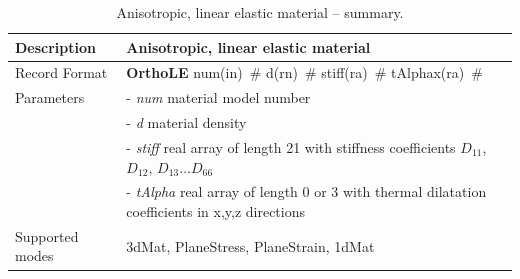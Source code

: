 \documentclass[a4paper]{article}
\newcommand{\descitem}[1]{{\noindent \bf #1}}
\newcommand{\elemparam}[2]{{{#1\tiny (#2)}~\#}}
\newcommand{\param}[1]{{\it #1}}
\newenvironment{mmt}{\begin{tabular}{|l|p{9cm}|}}{\end{tabular}\\}
\newenvironment{mmt}{\begin{tabular}{|l|l|}}{\end{tabular}\\}
\begin{document}
\begin{table}[!htb]
\begin{mmt}
\hline
Description & Anisotropic, linear elastic material\\
\hline
Record Format & \descitem{OrthoLE} \elemparam{num}{in}
\elemparam{d}{rn} \elemparam{stiff}{ra} \elemparam{tAlphax}{ra} \\
Parameters &- \param{num} material model number\\
&- \param{d} material density\\
&- \param{stiff} real array of length 21 with stiffness coefficients $D_{11}$, $D_{12}$, $D_{13}\ldots D_{66}$ \\
&- \param{tAlpha} real array of length 0 or 3 with thermal
dilatation coefficients in x,y,z directions\\
Supported modes& 3dMat, PlaneStress, PlaneStrain, 1dMat\\
\hline
\end{mmt}
\caption{Anisotropic, linear elastic material -- summary.}
\label{AnisoLE_table}
\end{table}
\end{document}
